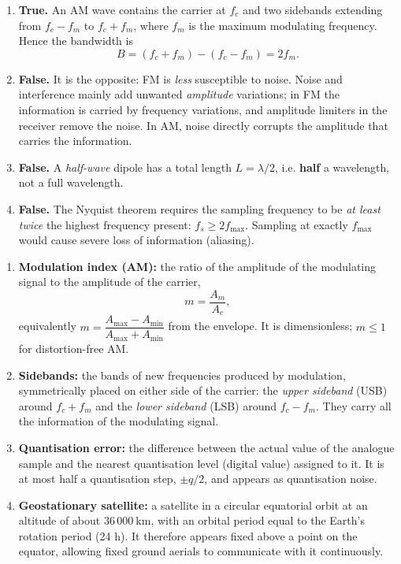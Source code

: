 \documentclass[11pt]{article}
\begin{document}
\begin{corrige}
\begin{enumerate}
\item \textbf{True.} An AM wave contains the carrier at $f_c$ and two sidebands extending from $f_c - f_m$ to $f_c + f_m$, where $f_m$ is the maximum modulating frequency. Hence the bandwidth is
\[ B = (f_c + f_m) - (f_c - f_m) = 2f_m. \]
\item \textbf{False.} It is the opposite: FM is \emph{less} susceptible to noise. Noise and interference mainly add unwanted \emph{amplitude} variations; in FM the information is carried by frequency variations, and amplitude limiters in the receiver remove the noise. In AM, noise directly corrupts the amplitude that carries the information.
\item \textbf{False.} A \emph{half-wave} dipole has a total length $L = \lambda/2$, i.e. \textbf{half} a wavelength, not a full wavelength.
\item \textbf{False.} The Nyquist theorem requires the sampling frequency to be \emph{at least twice} the highest frequency present: $f_s \geq 2 f_{\max}$. Sampling at exactly $f_{\max}$ would cause severe loss of information (aliasing).
\end{enumerate}
\end{corrige}

\begin{corrige}
\begin{enumerate}
\item \textbf{Modulation index (AM):} the ratio of the amplitude of the modulating signal to the amplitude of the carrier,
\[ m = \frac{A_m}{A_c}, \]
equivalently $m = \dfrac{A_{\max} - A_{\min}}{A_{\max} + A_{\min}}$ from the envelope. It is dimensionless; $m \leq 1$ for distortion-free AM.
\item \textbf{Sidebands:} the bands of new frequencies produced by modulation, symmetrically placed on either side of the carrier: the \emph{upper sideband} (USB) around $f_c + f_m$ and the \emph{lower sideband} (LSB) around $f_c - f_m$. They carry all the information of the modulating signal.
\item \textbf{Quantisation error:} the difference between the actual value of the analogue sample and the nearest quantisation level (digital value) assigned to it. It is at most half a quantisation step, $\pm q/2$, and appears as quantisation noise.
\item \textbf{Geostationary satellite:} a satellite in a circular equatorial orbit at an altitude of about $36\,000\ \mathrm{km}$, with an orbital period equal to the Earth's rotation period (24 h). It therefore appears fixed above a point on the equator, allowing fixed ground aerials to communicate with it continuously.
\end{enumerate}
\end{corrige}
\end{document}
